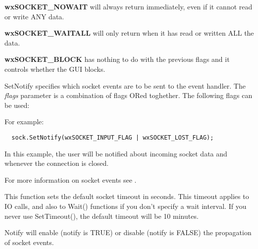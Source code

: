 {\bf wxSOCKET\_NOWAIT} will always return immediately, even if it cannot
read or write ANY data.

{\bf wxSOCKET\_WAITALL} will only return when it has read or written ALL
the data.

{\bf wxSOCKET\_BLOCK} has nothing to do with the previous flags and
it controls whether the GUI blocks.

%
%
\label{wxsocketbasesetnotify}


SetNotify specifies which socket events are to be sent to the event handler.
The {\it flags} parameter is a combination of flags ORed toghether. The
following flags can be used:

\twocolwidtha{7cm}
\begin{twocollist}\itemsep=0pt
\end{twocollist}

For example:

\begin{verbatim}
  sock.SetNotify(wxSOCKET_INPUT_FLAG | wxSOCKET_LOST_FLAG);
\end{verbatim}

In this example, the user will be notified about incoming socket data and
whenever the connection is closed.

For more information on socket events see .

%
%
\label{wxsocketbasesettimeout}


This function sets the default socket timeout in seconds. This
timeout applies to IO calls, and also to Wait() functions if you
don't specify a wait interval. If you never use SetTimeout(), the
default timeout will be 10 minutes.

%
%
\label{wxsocketbasenotify}


Notify will enable (notify is TRUE) or disable (notify is FALSE) the propagation
of socket events.

